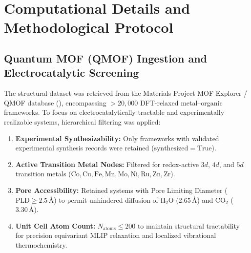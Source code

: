 \section{Computational Details and Methodological Protocol}

\subsection{Quantum MOF (QMOF) Ingestion and Electrocatalytic Screening}
The structural dataset was retrieved from the Materials Project MOF Explorer / QMOF database (\cite{qmof2021}), encompassing $>20,000$ DFT-relaxed metal--organic frameworks. To focus on electrocatalytically tractable and experimentally realizable systems, hierarchical filtering was applied:
\begin{enumerate}
    \item \textbf{Experimental Synthesizability:} Only frameworks with validated experimental synthesis records were retained ($\mathrm{synthesized} = \mathrm{True}$).
    \item \textbf{Active Transition Metal Nodes:} Filtered for redox-active $3d$, $4d$, and $5d$ transition metals ($\mathrm{Co, Cu, Fe, Mn, Mo, Ni, Ru, Zn, Zr}$).
    \item \textbf{Pore Accessibility:} Retained systems with Pore Limiting Diameter ($\mathrm{PLD} \ge 2.5\,\text{\AA}$) to permit unhindered diffusion of $\mathrm{H_2O}$ ($2.65\,\text{\AA}$) and $\mathrm{CO_2}$ ($3.30\,\text{\AA}$).
    \item \textbf{Unit Cell Atom Count:} $N_{\mathrm{atoms}} \le 200$ to maintain structural tractability for precision equivariant MLIP relaxation and localized vibrational thermochemistry.
\end{enumerate}

